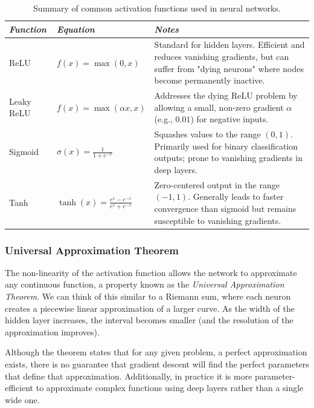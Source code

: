 \begin{table}[H]
\centering
\renewcommand{\arraystretch}{1.5}
\begin{tabularx}{0.95\textwidth}{l l X}
\toprule
\textit{Function} 
& \textit{Equation} 
& \textit{Notes} \\
\midrule
ReLU 
& $f(x) = \max(0, x)$ 
& Standard for hidden layers. Efficient and reduces vanishing gradients, but can suffer from "dying neurons" where nodes become permanently inactive. \\

Leaky ReLU 
& $f(x) = \max(\alpha x, x)$ 
& Addresses the dying ReLU problem by allowing a small, non-zero gradient $\alpha$ (e.g., $0.01$) for negative inputs. \\

Sigmoid 
& $\sigma(x) = \frac{1}{1 + e^{-x}}$ 
& Squashes values to the range $(0, 1)$. Primarily used for binary classification outputs; prone to vanishing gradients in deep layers. \\

Tanh 
& $\tanh(x) = \frac{e^x - e^{-x}}{e^x + e^{-x}}$ 
& Zero-centered output in the range $(-1, 1)$. Generally leads to faster convergence than sigmoid but remains susceptible to vanishing gradients. \\
\bottomrule
\end{tabularx}
\caption*{Summary of common activation functions used in neural networks.}
\end{table}

\subsubsection{Universal Approximation Theorem}

The non-linearity of the activation function allows the network to approximate any continuous function, a property known as the \textit{Universal Approximation Theorem}. We can think of this similar to a Riemann sum, where each neuron creates a piecewise linear approximation of a larger curve. As the width of the hidden layer increases, the interval becomes smaller (and the resolution of the approximation improves). 

Although the theorem states that for any given problem, a perfect approximation exists, there is no guarantee that gradient descent will find the perfect parameters that define that approximation. Additionally, in practice it is more parameter-efficient to approximate complex functions using deep layers rather than a single wide one.

